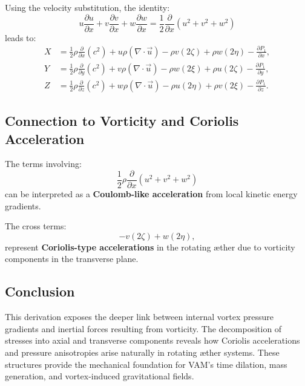 \documentclass[12pt]{article}
\begin{document}
    Using the velocity substitution, the identity:
    \[
        u \frac{\partial u}{\partial x} + v \frac{\partial v}{\partial x} + w \frac{\partial w}{\partial x} = \frac{1}{2} \frac{\partial}{\partial x}(u^2 + v^2 + w^2)
    \]
    leads to:
    \begin{align}
        X &= \frac{1}{2} \rho \frac{\partial}{\partial x}(c^2)
        + u \rho (\nabla \cdot \vec{u})
        - \rho v (2 \zeta) + \rho w (2 \eta)
        - \frac{\partial P_1}{\partial x}, \\
        Y &= \frac{1}{2} \rho \frac{\partial}{\partial y}(c^2)
        + v \rho (\nabla \cdot \vec{u})
        - \rho w (2 \xi) + \rho u (2 \zeta)
        - \frac{\partial P_1}{\partial y}, \\
        Z &= \frac{1}{2} \rho \frac{\partial}{\partial z}(c^2)
        + w \rho (\nabla \cdot \vec{u})
        - \rho u (2 \eta) + \rho v (2 \xi)
        - \frac{\partial P_1}{\partial z}.
    \end{align}

    \subsection*{Connection to Vorticity and Coriolis Acceleration}
    The terms involving:
    \begin{equation}
        \frac{1}{2} \rho \frac{\partial}{\partial x} (u^2 + v^2 + w^2)
    \end{equation}
    can be interpreted as a \textbf{Coulomb-like acceleration} from local kinetic energy gradients.

    The cross terms:
    \begin{equation}
        - v (2 \zeta) + w (2 \eta),
    \end{equation}
    represent \textbf{Coriolis-type accelerations} in the rotating æther due to vorticity components in the transverse plane.

    \subsection*{Conclusion}
    This derivation exposes the deeper link between internal vortex pressure gradients and inertial forces resulting from vorticity. The decomposition of stresses into axial and transverse components reveals how Coriolis accelerations and pressure anisotropies arise naturally in rotating æther systems. These structures provide the mechanical foundation for VAM’s time dilation, mass generation, and vortex-induced gravitational fields.
\end{document}
